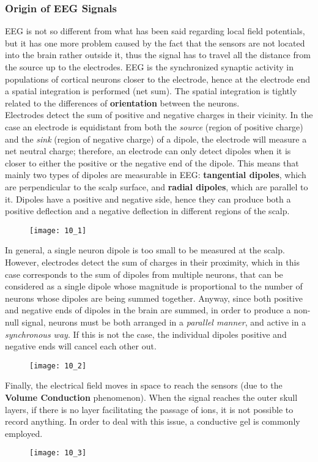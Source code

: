\subsubsection{Origin of EEG Signals}
EEG is not so different from what has been said regarding local field potentials, but it has
one more problem caused by the fact that the sensors are not located into the brain rather
outside it, thus the signal has to travel all the distance from the source up to the
electrodes. EEG is the synchronized synaptic activity in populations of cortical neurons
closer to the electrode, hence at the electrode end a spatial integration is performed (net
sum). The spatial integration is tightly related to the differences of \textbf{orientation}
between the neurons.\\
Electrodes detect the sum of positive and negative charges in their vicinity. In the case
an electrode is equidistant from both the \textit{source} (region of positive charge) and the
\textit{sink} (region of negative charge) of a dipole, the electrode will measure a net
neutral charge; therefore, an electrode can only detect dipoles when it is closer to either
the positive or the negative end of the dipole. This means that mainly two types of dipoles
are measurable in EEG: \textbf{tangential dipoles}, which are perpendicular to the scalp
surface, and \textbf{radial dipoles}, which are parallel to it. Dipoles have a positive and
negative side, hence they can produce both a positive deflection and a negative deflection
in different regions of the scalp.
\begin{figure}[H]
    \texttt{[image: 10\_1]}
    \centering
\end{figure}
In general, a single neuron dipole is too small to be measured at the scalp. However,
electrodes detect the sum of charges in their proximity, which in this case corresponds to
the sum of dipoles from multiple neurons, that can be considered as a single dipole whose
magnitude is proportional to the number of neurons whose dipoles are being summed together.
Anyway, since both positive and negative ends of dipoles in the brain are summed, in order to
produce a non-null signal, neurons must be both arranged in a \textit{parallel manner}, and
active in a \textit{synchronous way}. If this is not the case, the individual dipoles
positive and negative ends will cancel each other out.
\begin{figure}[H]
    \texttt{[image: 10\_2]}
    \centering
\end{figure}
Finally, the electrical field moves in space to reach the sensors (due to the
\textbf{Volume Conduction} phenomenon). When the signal reaches the outer skull layers, if
there is no layer facilitating the passage of ions, it is not possible to record anything.
In order to deal with this issue, a conductive gel is commonly employed.
\begin{figure}[H]
    \texttt{[image: 10\_3]}
    \centering
\end{figure}
